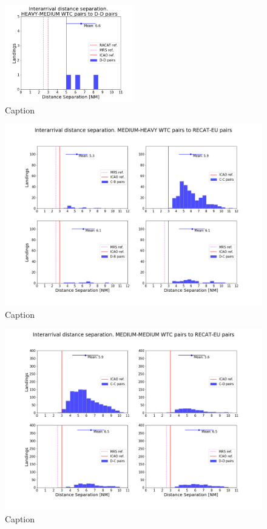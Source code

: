 \begin{figure}
    \centering
    \includegraphics[width=0.5\textwidth]{graphics/fig_HM_to_DD_pairs_dist_separ.png}
    \caption[list of figures caption]{Caption}
    \label{fig:HM_to_DD_pairs_dist_separ}
\end{figure}



\begin{figure}[h]
    \centering
    \includegraphics[width=1\textwidth]{graphics/fig_MH_to_RECAT_pairs_dist_separ.png}
    \caption[list of figures caption]{Caption}
    \label{fig:MH_to_RECAT_pairs_dist_separ}
\end{figure}

\begin{figure}[h]
    \centering
    \includegraphics[width=1.0\textwidth]{graphics/fig_MM_to_RECAT_pairs_dist_separ.png}
    \caption[list of figures caption]{Caption}
    \label{fig:MM_to_RECAT_pairs_dist_separ}
\end{figure}

